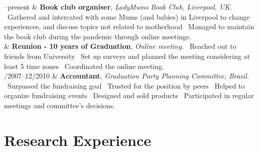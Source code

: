 \documentclass[11pt, a4paper]{article}
\newcommand{\Duration}[2]{\fontsize{10pt}{0}\selectfont #1--#2}
\newcommand{\Year}[1]{\fontsize{10pt}{0}\selectfont #1}
\begin{document}
\begin{EntriesTable}
	\Duration{2020}{present}  &
	\textbf{Book club organiser}, 
	\newline
	\textit{ LadyMums Book Club, Liverpool, UK.}
	\newline
	\textbullet \ Gathered and intercated with some Mums (and babies) in Liverpool to change 
	experiences, and discuss topics not related to motherhood	
	\textbullet \ Managed to maintain the book club during the pandemic through
	online meetings.
	\\
	\Year{2020}  &
	\textbf{Reunion - 10 years of Graduation},
	\newline
	\textit{ Online meeting.}
	\newline
	\textbullet \ Reached out to friends from University
	\textbullet \ Set up surveys and planned the meeting considering at least 5 
	time zones
	\textbullet \ Coordinated the online meeting.
	\\
	\Duration{04/2007}{12/2010}  &
	\textbf{Accountant},
	\newline
	\textit{ Graduation Party Planning Committee, Brazil.}
	\newline
	\textbullet \ Surpassed the fundraising goal 
	\textbullet \ Trusted for the position by peers 
	\textbullet \ Helped to organize fundraising events  
	\textbullet \ Designed and sold products 
	\textbullet \ Participated in regular meetings and
	committee's decisions.

\end{EntriesTable}


\section*{Research Experience}
\end{document}
